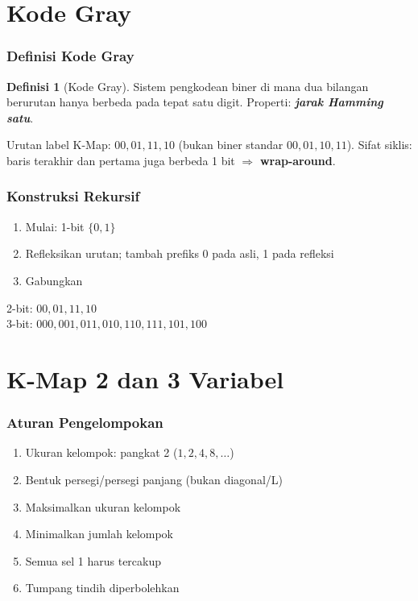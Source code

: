\documentclass[handout]{beamer}
\newcommand{\logic}[1]{\textbf{\textit{#1}}}
\theoremstyle{definition}
\newtheorem{definisi}[theorem]{Definisi}
\theoremstyle{example}
\begin{document}
\section{Kode Gray}

\begin{frame}
\frametitle{Definisi Kode Gray}
\begin{definisi}[Kode Gray]
Sistem pengkodean biner di mana dua bilangan berurutan hanya berbeda pada tepat satu digit. Properti: \logic{jarak Hamming satu}.
\end{definisi}
Urutan label K-Map: $00, 01, 11, 10$ (bukan biner standar $00, 01, 10, 11$). Sifat siklis: baris terakhir dan pertama juga berbeda 1 bit $\Rightarrow$ \textbf{wrap-around}.
\end{frame}

\begin{frame}
\frametitle{Konstruksi Rekursif}
\begin{enumerate}
  \item Mulai: 1-bit $\{0, 1\}$
  \item Refleksikan urutan; tambah prefiks 0 pada asli, 1 pada refleksi
  \item Gabungkan
\end{enumerate}
2-bit: $00, 01, 11, 10$\\
3-bit: $000, 001, 011, 010, 110, 111, 101, 100$
\end{frame}

\section{K-Map 2 dan 3 Variabel}

\begin{frame}
\frametitle{Aturan Pengelompokan}
\begin{enumerate}
  \item Ukuran kelompok: pangkat 2 ($1, 2, 4, 8, \ldots$)
  \item Bentuk persegi/persegi panjang (bukan diagonal/L)
  \item Maksimalkan ukuran kelompok
  \item Minimalkan jumlah kelompok
  \item Semua sel 1 harus tercakup
  \item Tumpang tindih diperbolehkan
\end{enumerate}
\end{frame}
\end{document}
